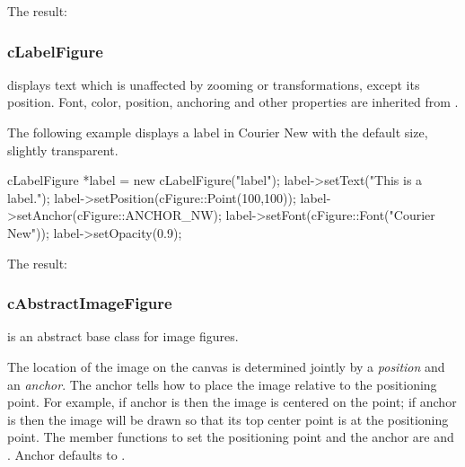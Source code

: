 

The result:

\begin{center}

\end{center}


\subsubsection{cLabelFigure}
\label{sec:graphics:labelfigure}

 displays text which is unaffected by zooming or
transformations, except its position. Font, color, position, anchoring and
other properties are inherited from .

The following example displays a label in Courier New with the default
size, slightly transparent.

\begin{cpp}
cLabelFigure *label = new cLabelFigure("label");
label->setText("This is a label.");
label->setPosition(cFigure::Point(100,100));
label->setAnchor(cFigure::ANCHOR_NW);
label->setFont(cFigure::Font("Courier New"));
label->setOpacity(0.9);
\end{cpp}


The result:

\begin{center}

\end{center}


\subsubsection{cAbstractImageFigure}
\label{sec:graphics:abstractimagefigure}

 is an abstract base class for image figures.

The location of the image on the canvas is determined jointly by a
\textit{position} and an \textit{anchor}. The anchor tells how to
place the image relative to the positioning point. For example,
if anchor is  then the image is centered on the point;
if anchor is  then the image will be drawn so that its top
center point is at the positioning point. The member functions to set the
positioning point and the anchor are  and
. Anchor defaults to .

